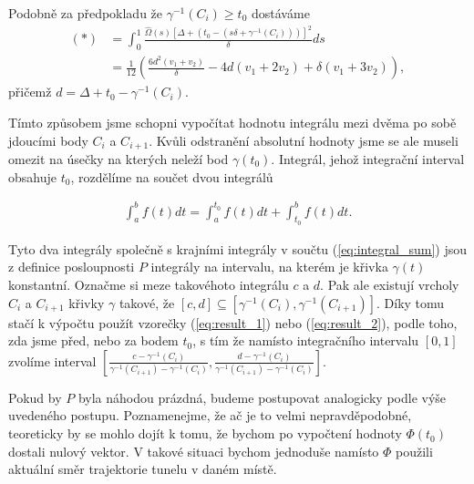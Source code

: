 Podobně za předpokladu že $ \gamma^{-1}(C_i) \geq t_0$ dostáváme
\begin{align}
    (*) &= \int_{0}^{1}
        \frac{\widehat{\Omega}(s)
            \left[\Delta + (t_0 - (s \delta + \gamma^{-1}(C_i)) ) \right]^2}
        {\delta}
         ds \\
    &= \frac{1}{12} \left(
        \frac{6 d^2 (v_1+v_2 )}{\delta}
        - 4 d (v_1+2 v_2 )
        + \delta (v_1+3 v_2 ) \right), \label{eq:result_2}
\end{align}
přičemž $ d = \Delta + t_0 - \gamma^{-1}(C_i) $.

Tímto způsobem jsme schopni vypočítat hodnotu integrálu mezi dvěma po sobě jdoucími
body $ C_i $ a $ C_{i + 1} $. Kvůli odstranění absolutní hodnoty jsme se ale
museli omezit na úsečky na kterých neleží bod $ \gamma(t_0) $. Integrál, jehož
integrační interval obsahuje $ t_0 $, rozdělíme na součet dvou
integrálů

\begin{align*}
    \int_{a}^{b} f(t) dt = \int_{a}^{t_0} f(t) dt + \int_{t_0}^{b} f(t) dt.
\end{align*}

Tyto dva integrály společně s krajními integrály v součtu (\ref{eq:integral_sum})
jsou z definice posloupnosti $ P $ integrály na intervalu, na kterém je křivka
$ \gamma(t) $ konstantní. Označme si meze takovéhoto integrálu $ c $ a $ d $.
Pak ale existují vrcholy $ C_i $ a $ C_{i + 1} $ křivky $ \gamma $ takové, že
$ [c, d] \subseteq [\gamma^{-1}(C_i), \gamma^{-1}(C_{i + 1})] $. Díky tomu stačí
k výpočtu použít vzorečky (\ref{eq:result_1}) nebo (\ref{eq:result_2}), podle
toho, zda jsme před, nebo za bodem $ t_0 $, s tím že
namísto integračního intervalu $ [0, 1] $ zvolíme interval
$ \left[ \frac{c - \gamma^{-1}(C_i)}{\gamma^{-1}(C_{i + 1}) - \gamma^{-1}(C_i)},
 \frac{d - \gamma^{-1}(C_i)}{\gamma^{-1}(C_{i + 1}) - \gamma^{-1}(C_i)} \right] $.

Pokud by $ P $ byla náhodou prázdná, budeme postupovat
analogicky podle výše uvedeného postupu. Poznamenejme, že ač je to velmi
nepravděpodobné, teoreticky by se mohlo dojít k tomu, že bychom po vypočtení
hodnoty $ \Phi(t_0) $ dostali nulový vektor. V takové situaci bychom jednoduše
namísto $ \Phi $ použili aktuální směr trajektorie tunelu v daném místě.


